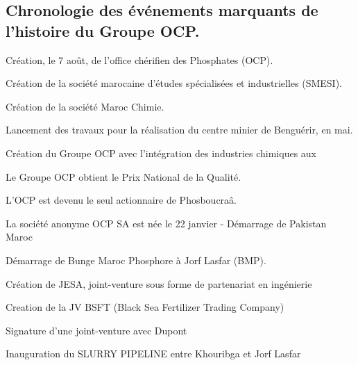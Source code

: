 	\subsection{Chronologie des événements marquants de l’histoire du Groupe OCP.}
	\begin{description}[align=left]
		\item [1920 :] Création, le 7 août, de l'office chérifien des Phosphates (OCP).
		\item [1959 :] Création de la société marocaine d'études spécialisées et industrielles (SMESI).
		\item [1965 :] Création de la société Maroc Chimie.
		\item [1974 :] Lancement des travaux pour la réalisation du centre minier de Benguérir, en mai.
		\item [1975 :] Création du Groupe OCP avec l'intégration des industries chimiques aux
		\item [1998 :] Le Groupe OCP obtient le Prix National de la Qualité.
		\item [2003 :] L'OCP est devenu le seul actionnaire de Phosboucraâ.
		\item [2008 :] La société anonyme OCP SA est née le 22 janvier - Démarrage de Pakistan Maroc
		\item [2009 :] Démarrage de Bunge Maroc Phosphore à Jorf Lasfar (BMP).
		\item [2010 :] Création de JESA, joint-venture sous forme de partenariat en ingénierie
		\item [2012 :] Creation de la JV BSFT (Black Sea Fertilizer Trading Company)
		\item [2013 :] Signature d’une joint-venture avec Dupont
		\item [2014 :] Inauguration du SLURRY PIPELINE entre Khouribga et Jorf Lasfar
	\end{description}
	
